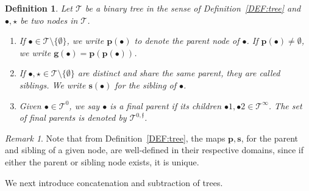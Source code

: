 \documentclass[a4paper,
11pt,  reqno]{amsart}
\newcommand{\5}{\textup{V}}
\newtheorem{definition}[theorem]{Definition}
\theoremstyle{remark}
\newtheorem{remark}[theorem]{Remark}
\newcommand{\bul}{\bullet}
\newcommand{\TT}{\mathcal{T}}
\newcommand{\pb}{\mathbf{p}}
\newcommand{\gb}{\mathbf{g}}
\newcommand{\sbf}{\mathbf{s}}
\newcommand{\ff}{\mathfrak{f}}
\numberwithin{equation}{section}
\numberwithin{theorem}{section}
\begin{document}
\begin{definition}\rm
\label{DEF:tree2}
Let $\TT$ be a binary tree in the sense of Definition~\ref{DEF:tree} and 
$\bul, \star$ be two nodes in $\TT$. 

\begin{enumerate}



\smallskip
\item[(i)]
If $\bul \in \TT\setminus \{ \emptyset\}$, we write $\pb(\bul)$ to denote the \emph{parent node} of $\bul$. If $\pb(\bul)\neq \emptyset$, we write $\gb(\bul)=\pb(\pb(\bul))$.

\smallskip
\item[(ii)] 
If $\bul, \star\in \TT \setminus\{ \emptyset \}$ are distinct and share the same parent, they are called \textit{siblings}. We write $\sbf(\bul)$ for the sibling of $\bul$. 

\smallskip
\item[(iii)] 
Given $\bul\in \TT^0$, we say $\bul$ is a \textit{final parent} if its children $\bul1, \bul2 \in \TT^\infty$. The set of final parents is denoted by $\TT^{0,\ff}$.


\end{enumerate}



\end{definition}


\begin{remark}\rm 
Note that from Definition~\ref{DEF:tree}, the maps $\pb, \sbf$, for the parent and sibling of a given node, are well-defined in their respective domains, since if either the parent or sibling node exists, it is unique. 

\end{remark}





We next introduce concatenation and subtraction of trees. 
\end{document}
